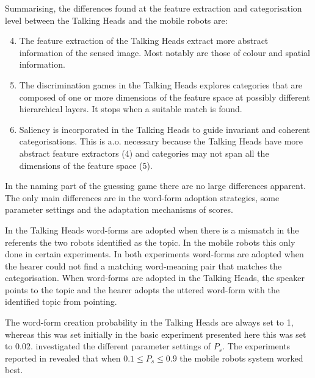 Summarising, the differences found at the feature extraction and categorisation level between the Talking Heads and the mobile robots are:

\begin{enumerate}
\setcounter{enumi}{3}
\item The feature extraction of the Talking Heads extract more abstract information of the sensed image. Most notably are those of colour and spatial information.
\item The discrimination games in the Talking Heads explores categories that are composed of one or more dimensions of the feature space at possibly different hierarchical layers. It stops when a suitable match is found.
\item Saliency is incorporated in the Talking Heads to guide invariant and coherent categorisations. This is a.o. necessary because the Talking Heads have more abstract feature extractors (4) and categories may not span all the dimensions of the feature space (5).
\end{enumerate}

In the naming part of the guessing game there are no large differences apparent. The only main differences are in the word-form adoption strategies, some parameter settings and the adaptation mechanisms of scores.

In the Talking Heads word-forms are adopted when there is a mismatch in the referents the two robots identified as the topic. In the mobile robots this only done in certain experiments. In both experiments word-forms are adopted when the hearer could not find a matching word-meaning pair that matches the categorisation. When word-forms are adopted in the Talking Heads, the speaker points to the topic and the hearer adopts the uttered word-form with the identified topic from pointing.

The word-form creation probability in the Talking Heads are always set to 1, whereas this was set initially in the basic experiment presented here this was set to 0.02. \citet{kaplan:2000} investigated the different parameter settings of $P_s$. The experiments reported in  revealed that when $0.1 \leq P_s\leq 0.9$ the mobile robots system worked best.

